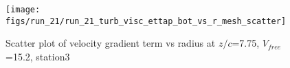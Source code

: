 \begin{figure}[H]
\centering
\texttt{[image: figs/run\_21/run\_21\_turb\_visc\_ettap\_bot\_vs\_r\_mesh\_scatter]}
\caption{Scatter plot of velocity gradient term vs radius at $z/c$=7.75, $V_{free}$=15.2, station3}
\label{fig:run_21_turb_visc_ettap_bot_vs_r_mesh_scatter}
\end{figure}


